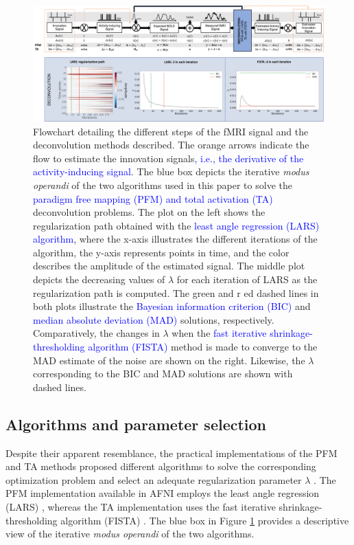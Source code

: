 \begin{figure}[t!]
    \begin{center}
        \includegraphics[width=\columnwidth]{figures/flowchart.pdf}
    \end{center}
    \caption{Flowchart detailing the different steps of the fMRI signal and the
    deconvolution methods described. The orange arrows indicate the flow to
    estimate the innovation signals\textcolor{blue}{, i.e., the derivative of
    the activity-inducing signal}. The blue box depicts the iterative
    \textit{modus operandi} of the two algorithms used in this paper to solve
    the \textcolor{blue}{paradigm free mapping (PFM) and total activation (TA)}
    deconvolution problems. The plot on the left shows the regularization path
    obtained with the \textcolor{blue}{least angle regression (LARS) algorithm},
    where the x-axis illustrates the different iterations of the algorithm, the
    y-axis represents points in time, and the color describes the amplitude of
    the estimated signal. The middle plot depicts the decreasing values of
    $\lambda$ for each iteration of LARS as the regularization path is computed.
    The green and r ed dashed lines in both plots illustrate the
    \textcolor{blue}{Bayesian information criterion (BIC)} and
    \textcolor{blue}{median absolute deviation (MAD)} solutions, respectively.
    Comparatively, the changes in $\lambda$ when the
    \textcolor{blue}{fast iterative shrinkage-thresholding algorithm (FISTA)}
    method is made to converge to the MAD estimate of the noise are shown on the
    right. Likewise, the $\lambda$ corresponding to the BIC and MAD solutions
    are shown with dashed lines.}
\label{fig:flowchart}
\end{figure}

\subsection{Algorithms and parameter selection}
\label{sec:regparam}
Despite their apparent resemblance, the practical implementations of the PFM and
TA methods proposed different algorithms to solve the corresponding optimization
problem and select an adequate regularization parameter $\lambda$
\citep{Gaudes2013Paradigmfreemapping,Karahanoglu2013TotalactivationfMRI}. The
PFM implementation available in AFNI employs the least angle regression (LARS)
\citep{Efron2004Leastangleregression}, whereas the TA implementation uses the
fast iterative shrinkage-thresholding algorithm (FISTA)
\citep{Beck2009FastIterativeShrinkage}. The blue box in Figure
\ref{fig:flowchart} provides a descriptive view of the iterative \textit{modus
operandi} of the two algorithms.

